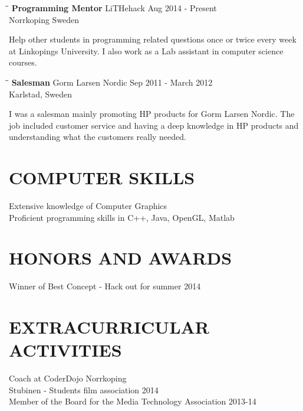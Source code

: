 \documentclass{res}
\begin{document}
\begin{resume}
   \begin{tabbing}
   \hspace{2.3in}\= \hspace{2.6in}\= \kill %
    {\bf Programming Mentor} \>LiTHehack \> Aug 2014 - Present\\
                          \>Norrkoping Sweden
   \end{tabbing}\vspace{-20pt}
    Help other students in programming related questions once or twice every week at Linkopings University. I also work as a Lab assistant in computer science courses.

   \begin{tabbing}%
   \hspace{2.3in}\= \hspace{2.6in}\= \kill %
   {\bf Salesman}  \>Gorm Larsen Nordic \> Sep 2011 - March 2012\\
                          \>Karlstad, Sweden
   \end{tabbing}\vspace{-20pt}
    I was a salesman mainly promoting HP products for Gorm Larsen Nordic. The job included customer service and having a deep knowledge in HP products and understanding what the customers really needed.        


\section{COMPUTER SKILLS}          
    Extensive knowledge of Computer Graphics \\         
    Proficient programming skills in C++, Java, OpenGL, Matlab
 
 
\section{HONORS AND AWARDS}          
    Winner of Best Concept - Hack out for summer 2014   
 
\section{EXTRACURRICULAR ACTIVITIES}          
    Coach at CoderDojo Norrkoping \\         
    Stubinen - Students film association 2014     \\     
    Member of the Board for the Media Technology Association  2013-14\\        
           
 
\end{resume}
\end{document}

